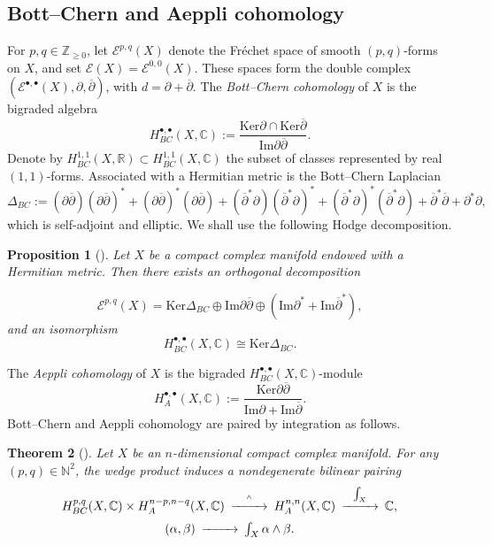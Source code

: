 \documentclass[11pt,letterpaper]{amsart}
\numberwithin{equation}{section}
\newcommand{\CC}{\mathbb{C}}
\newcommand{\cal}{\mathcal}
\def\cE{{\cal E}}
\newtheorem{prop}{Proposition}[section]
\newtheorem{theo}[prop]{Theorem}
\def\dbar{\overline{\partial}}
\def\beq{\begin{equation}}
\def\eeq{\end{equation}}
\begin{document}
\subsection{Bott--Chern and Aeppli cohomology}
For $p,q\in\mathbb Z_{\ge0}$, let $\cE^{p,q}(X)$ denote the Fr\'echet space of smooth $(p,q)$-forms on $X$, and set $\cE(X)=\cE^{0,0}(X)$. These spaces form the double complex $(\cE^{\bullet,\bullet}(X),\partial,\dbar)$, with $d=\partial+\dbar$.
The {\em Bott--Chern cohomology} of $X$ is the bigraded algebra
\beq H^{\bullet,\bullet}_{BC}(X,\CC) := \frac{\mathrm{Ker}\partial\cap\mathrm{Ker}\dbar}{\mathrm{Im}\partial\dbar}.\nonumber\eeq
Denote by $H^{1,1}_{BC}(X,\mathbb{R})\subset H^{1,1}_{BC}(X,\mathbb{C})$ the subset of classes represented by real $(1,1)$-forms. Associated with a Hermitian metric is the Bott--Chern Laplacian
$$
\Delta_{BC}:=(\partial\dbar)(\partial\dbar)^*+(\partial\dbar)^*(\partial\dbar)+(\dbar^*\partial)(\dbar^*\partial)^*+(\dbar^*\partial)^*(\dbar^*\partial)+\dbar^*\dbar+\partial^*\partial,
$$
which is self-adjoint and elliptic. We shall use the following Hodge decomposition.

\begin{prop}[{\cite[Theorem 2.3]{A1}}]
Let $X$ be a compact complex manifold endowed
with a Hermitian metric. Then there exists an orthogonal decomposition

\begin{equation}\nonumber
\cE^{p,q}(X)=\mathrm{Ker}\Delta_{BC}\oplus\mathrm{Im}\partial\dbar\oplus(\mathrm{Im}\partial^*+\mathrm{Im}\dbar^*),
\end{equation}
and an isomorphism
\begin{equation}\nonumber
H^{\bullet,\bullet}_{BC}(X,\CC)\cong \mathrm{Ker}\Delta_{BC}.
\end{equation}
\end{prop}

The {\em Aeppli cohomology} of $X$ is the bigraded $H^{\bullet,\bullet}_{BC}(X,\CC)$-module
$$ H^{\bullet,\bullet}_{A}(X,\CC) := \frac{\mathrm{Ker}\partial\dbar}{\mathrm{Im}\partial+\mathrm{Im}\dbar} .$$
Bott--Chern and Aeppli cohomology are paired by integration as follows.

\begin{theo}[{\cite[Lemma 2.5]{Sch}}]\label{pair}
Let $X$ be an $n$-dimensional compact complex manifold. For any $(p,q)\in\mathbb{N}^2$, the wedge product induces a nondegenerate bilinear pairing
\beq
\begin{CD}
  H^{p,q}_{BC}(X,\CC)\times H^{n-p,n-q}_{A}(X,\CC)@>^\wedge>>H^{n,n}_{A}(X,\CC)@>^{\int_{X}}>>\mathbb{C},\nonumber
  \end{CD}
\eeq
\beq
\begin{CD}
  (\alpha,\beta) @>>>\int_X\alpha\wedge\beta.
\end{CD}\nonumber
\eeq

\end{theo}
\end{document}

